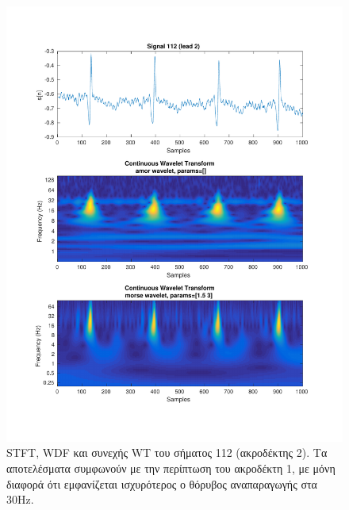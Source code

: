 \documentclass[11pt,a4paper]{article}
\begin{document}
\begin{figure}[H]
\begin{minipage}{0.48\textwidth}
	\includegraphics[width=\textwidth]{fig/112l2_cwt.pdf}
\end{minipage}
\vfill
\caption{STFT, WDF και συνεχής WT του σήματος 112 (ακροδέκτης 2). Τα αποτελέσματα συμφωνούν με την περίπτωση του ακροδέκτη 1, με μόνη διαφορά ότι εμφανίζεται ισχυρότερος ο θόρυβος αναπαραγωγής στα 30Hz.}
\label{fig:112l2_stft_wdf_wt}
\end{figure}
\end{document}
